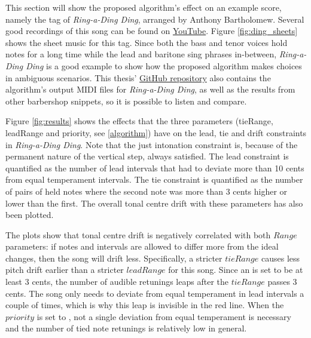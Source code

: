 \documentclass[a4paper]{article}
\begin{document}
This section will show the proposed algorithm's effect on an example score, namely the tag of \textit{Ring-a-Ding Ding}, arranged by Anthony Bartholomew. Several good recordings of this song can be found on \href{https://www.youtube.com/watch?v=G40I5JDtfjI&t=147s}{YouTube}. Figure \ref{fig:ding_sheets} shows the sheet music for this tag. Since both the bass and tenor voices hold notes for a long time while the lead and baritone sing phrases in-between, \textit{Ring-a-Ding Ding} is a good example to show how the proposed algorithm makes choices in ambiguous scenarios. This thesis' \href{https://github.com/teuncb/adaptivebarbershop}{GitHub repository} also contains the algorithm's output MIDI files for \textit{Ring-a-Ding Ding}, as well as the results from other barbershop snippets, so it is possible to listen and compare.

Figure \ref{fig:results} shows the effects that the three parameters (tieRange, leadRange and priority, see \ref{algorithm}) have on the lead, tie and drift constraints in \textit{Ring-a-Ding Ding}. Note that the just intonation constraint is, because of the permanent nature of the vertical step, always satisfied. The lead constraint is quantified as the number of lead intervals that had to deviate more than 10 cents from equal temperament intervals. The tie constraint is quantified as the number of pairs of held notes where the second note was more than 3 cents higher or lower than the first. The overall tonal centre drift with these parameters has also been plotted.

The plots show that tonal centre drift is negatively correlated with both $\mathit{Range}$ parameters: if notes and intervals are allowed to differ more from the ideal changes, then the song will drift less. Specifically, a stricter $\mathit{tieRange}$ causes less pitch drift earlier than a stricter $\mathit{leadRange}$ for this song. Since an  is set to be at least 3 cents, the number of audible retunings leaps after the $\mathit{tieRange}$ passes 3 cents. The song only needs to deviate from equal temperament in lead intervals a couple of times, which is why this leap is invisible in the red line. When the $\mathit{priority}$ is set to , not a single deviation from equal temperament is necessary and the number of tied note retunings is relatively low in general.
\end{document}
